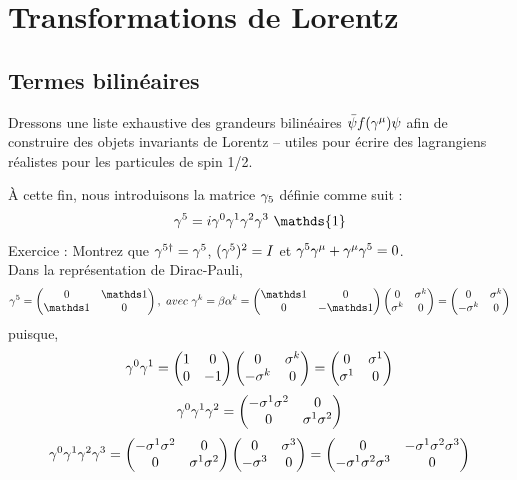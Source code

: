 \section{Transformations de Lorentz}
\subsection{Termes bilinéaires}
Dressons une liste exhaustive des grandeurs bilinéaires $\bar{\psi}f(\gamma^{\mu})\psi$
afin de construire des objets invariants de Lorentz – utiles pour écrire des lagrangiens
réalistes pour les particules de spin 1/2.

À cette fin, nous introduisons la matrice $\gamma_5$ définie comme suit :
\[
\g^5=i\g^0\g^1\g^2\g^3\ \mathds{1}
\]
Exercice : Montrez que $\gamma^{5\dagger}=\gamma^5$, $(\gamma^{5})^2=I$ et
$\gamma^5\gamma^\mu+\gamma^\mu\gamma^5=0$.\\
Dans la représentation de Dirac-Pauli,
\[
\g^5=\begin{pmatrix}0&\Id\\\Id&0\end{pmatrix},\ avec\ \g^k=\beta\alpha^k
=\begin{pmatrix} \Id & 0 \\ 0 & -\Id \end{pmatrix}
\begin{pmatrix} 0 & \s^k \\ \s^k & 0 \end{pmatrix}=
\begin{pmatrix} 0 & \s^k \\ -\s^k & 0 \end{pmatrix}
\]
puisque,
\[
\gamma^0\gamma^1 = \begin{pmatrix} 1 & 0 \\ 0 & -1 \end{pmatrix}
\begin{pmatrix} 0 & \sigma^k \\ -\sigma^k & 0 \end{pmatrix}=
\begin{pmatrix} 0 & \sigma^1 \\ \sigma^1 & 0 \end{pmatrix}
\]
\[
\gamma^0\gamma^1\gamma^2 = 
\begin{pmatrix} -\sigma^1\sigma^2 & 0 \\ 0 & \sigma^1\sigma^2 \end{pmatrix}
\]
\[
\gamma^0\gamma^1\gamma^2\gamma^3 = 
\begin{pmatrix} -\sigma^1\sigma^2 & 0 \\ 0 & \sigma^1\sigma^2 \end{pmatrix}
\begin{pmatrix} 0 & \sigma^3 \\ -\sigma^3 & 0 \end{pmatrix} = 
\begin{pmatrix}0&-\sigma^1\sigma^2\sigma^3\\-\sigma^1\sigma^2\sigma^3&0\end{pmatrix}
\]
